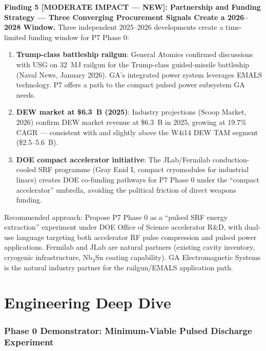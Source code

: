 \documentclass[11pt]{article}
\begin{document}
\begin{tcolorbox}[colback=blue!5!white, colframe=blue!60!black,
  title=\textbf{W4i15 P7 --- Top 5 Findings (Ranked by Impact)}]
\textbf{Finding 5 [MODERATE IMPACT --- NEW]: Partnership and
Funding Strategy --- Three Converging Procurement Signals Create
a 2026--2028 Window.}
Three independent 2025--2026 developments create a time-limited
funding window for P7 Phase 0:
\begin{enumerate}[nosep]
  \item \textbf{Trump-class battleship railgun}: General Atomics
    confirmed discussions with USG on 32~MJ railgun for the
    Trump-class guided-missile battleship (Naval News, January 2026).
    GA's integrated power system leverages EMALS technology. P7
    offers a path to the compact pulsed power subsystem GA needs.
  \item \textbf{DEW market at \$6.3~B (2025)}: Industry projections
    (Scoop Market, 2026) confirm DEW market revenue at \$6.3~B in
    2025, growing at 19.7\% CAGR --- consistent with and slightly
    above the W4i14 DEW TAM segment (\$2.5--5.6~B).
  \item \textbf{DOE compact accelerator initiative}: The JLab/Fermilab
    conduction-cooled SRF programme (Gray Enid I, compact cryomodules
    for industrial linacs) creates DOE co-funding pathways for P7
    Phase 0 under the ``compact accelerator'' umbrella, avoiding
    the political friction of direct weapons funding.
\end{enumerate}
Recommended approach: Propose P7 Phase 0 as a ``pulsed SRF energy
extraction'' experiment under DOE Office of Science accelerator R\&D,
with dual-use language targeting both accelerator RF pulse compression
and pulsed power applications. Fermilab and JLab are natural partners
(existing cavity inventory, cryogenic infrastructure, Nb$_3$Sn
coating capability). GA Electromagnetic Systems is the natural
industry partner for the railgun/EMALS application path.

\end{tcolorbox}

\part{Engineering Deep Dive}
\label{part:engineering}

\section{Phase 0 Demonstrator: Minimum-Viable Pulsed Discharge Experiment}
\label{sec:phase0}
\end{document}

